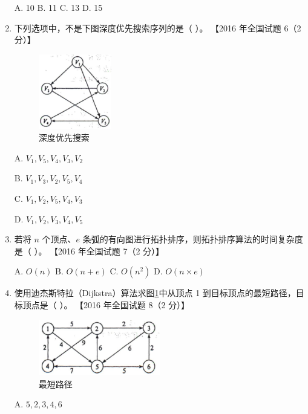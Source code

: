 \documentclass[lang=cn,newtx,10pt,scheme=chinese]{elegantbook}
\begin{document}
\begin{enumerate}
    A. 10 \quad B. 11 \quad C. 13 \quad D. 15  

    \item 下列选项中，不是下图深度优先搜索序列的是（ ）。  
    【2016 年全国试题 6（2 分）】  

    \begin{figure}[h!]
            \centering
            \includegraphics[width=0.3\textwidth]{./figure/exercisePicPDF/chapter7/7-5.pdf}
            \caption{深度优先搜索}
    \end{figure}

        A. $V_1, V_5, V_4, V_3, V_2$  

        B. $V_1, V_3, V_2, V_5, V_4$  

        C. $V_1, V_2, V_5, V_4, V_3$  

        D. $V_1, V_2, V_3, V_4, V_5$  


    \item 若将 $n$ 个顶点、$e$ 条弧的有向图进行拓扑排序，则拓扑排序算法的时间复杂度是（ ）。  
    【2016 年全国试题 7（2 分）】  

    A. $O(n)$ \quad B. $O(n + e)$ \quad C. $O(n^2)$ \quad D. $O(n \times e)$  

    \item 使用迪杰斯特拉（Dijkstra）算法求图\ref{fig:7-7}中从顶点 1 到目标顶点的最短路径，目标顶点是（ ）。  
    【2016 年全国试题 8（2 分）】 
    
    \begin{figure}[h!]
            \centering
            \includegraphics[width=0.5\textwidth]{./figure/exercisePicPDF/chapter7/7-7.pdf}
            \caption{最短路径}
            \label{fig:7-7}
    \end{figure}

        A. $5, 2, 3, 4, 6$  


\end{enumerate}
\end{document}
